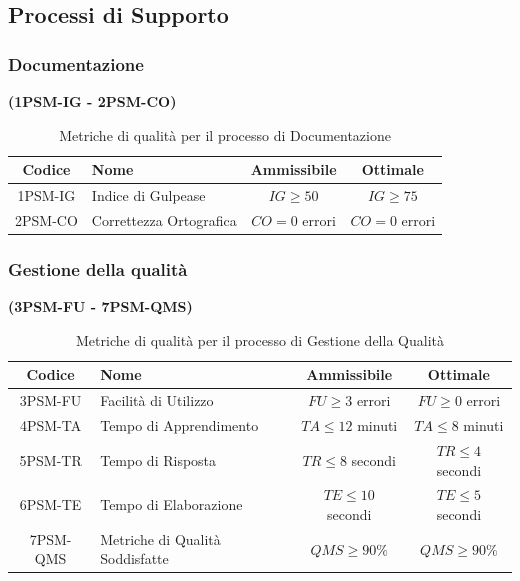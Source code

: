 \documentclass{article}
\begin{document}
\subsection{Processi di Supporto}
\subsubsection{Documentazione}%
\textbf{(1PSM-IG - 2PSM-CO)}

\begin{table}[H]
    \centering
    \renewcommand{\arraystretch}{1.5} %
    \begin{tabular}{|c|l|c|c|}
        \hline
        \textbf{Codice} & \textbf{Nome} & \textbf{Ammissibile} & \textbf{Ottimale} \\
        \hline
        1PSM-IG & Indice di Gulpease & $IG \geq 50$ & $IG \geq 75$ \\
        2PSM-CO & Correttezza Ortografica & $CO = 0$ errori & $CO = 0$ errori \\ 
        \hline
    \end{tabular}
    \label{tab:documentazione}
    \caption{Metriche di qualità per il processo di Documentazione}
\end{table}
\newpage
\subsubsection{Gestione della qualità}%
\textbf{(3PSM-FU - 7PSM-QMS)}
\begin{table}[H]
    \centering
    \renewcommand{\arraystretch}{1.5} %
    \begin{tabular}{|c|l|c|c|}
        \hline
        \textbf{Codice} & \textbf{Nome} & \textbf{Ammissibile} & \textbf{Ottimale} \\
        \hline
        3PSM-FU & Facilità di Utilizzo & $FU \geq 3$ errori & $FU \geq 0$ errori \\
        4PSM-TA & Tempo di Apprendimento & $TA \leq 12$ minuti & $TA \leq 8$ minuti \\
        5PSM-TR & Tempo di Risposta & $TR \leq 8$ secondi & $TR \leq 4$ secondi \\
        6PSM-TE & Tempo di Elaborazione & $TE \leq 10$ secondi & $TE \leq 5$ secondi \\
        7PSM-QMS & Metriche di Qualità Soddisfatte & $QMS \geq 90\%$ & $QMS \geq 90\%$\\
        \hline
    \end{tabular}
    \label{tab:gestione_qualità}
    \caption{Metriche di qualità per il processo di Gestione della Qualità}
\end{table}
\end{document}
